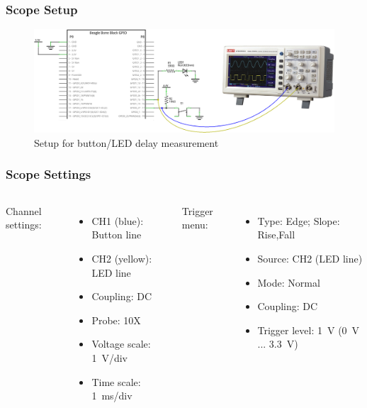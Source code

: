 \begin{frame}
  \frametitle{Scope Setup}
  \begin{figure}
    \centering
    \includegraphics[scale=0.25]{images/scope-setup.png}
    \caption{Setup for button/LED delay measurement}
  \end{figure}
\end{frame}

\begin{frame}
  \frametitle{Scope Settings}
  \begin{columns}
    Channel settings:
    \begin{itemize}
      \item CH1 (blue): Button line
      \item CH2 (yellow): LED line
      \item Coupling: DC
      \item Probe: 10X
      \item Voltage scale: \SI{1}{\volt / div}
      \item Time scale: \SI{1}{\ms / div}
    \end{itemize}

    Trigger menu:
    \begin{itemize}
      \item Type: Edge; Slope: Rise,Fall
      \item Source: CH2 (LED line)
      \item Mode: Normal
      \item Coupling: DC
      \item Trigger level: \SI{1}{\volt} (\SI{0}{\volt} ... \SI{3.3}{\volt})
    \end{itemize}
  \end{columns}
\end{frame}

